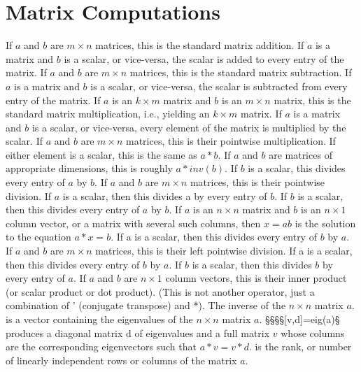\section{Matrix Computations}{}
	{If $a$ and $b$ are $m \times n$ matrices, this is the standard matrix addition. If $a$ is a matrix and $b$ is a scalar, or vice-versa, the scalar is added to every entry of the matrix.}
	{If $a$ and $b$ are $m \times n$ matrices, this is the standard matrix subtraction. If $a$ is a matrix and $b$ is a scalar, or vice-versa, the scalar is subtracted from every entry of the matrix.}
	{If $a$ is an $k \times m$ matrix and $b$ is an $m \times n$ matrix, this is the standard matrix multiplication, i.e., yielding an $k \times m$ matrix. If $a$ is a matrix and $b$ is a scalar, or vice-versa, every element of the matrix is multiplied by the scalar.}
	{If $a$ and $b$ are $m \times n$ matrices, this is their pointwise multiplication. If either element is a scalar, this is the same as $a*b$.}
	{If $a$ and $b$ are matrices of appropriate dimensions, this is roughly $a*inv(b).$ If $b$ is a scalar, this divides every entry of $a$ by $b$.}
	{If $a$ and $b$ are $m \times n$ matrices, this is their
pointwise division. If $a$ is a scalar, then this divides a by every entry of
$b$. If $b$ is a scalar, then this divides every entry of $a$ by $b$. }
	{If $a$ is an $n \times n$ matrix and $b$ is an $n \times
1$ column vector, or a matrix with several such columns, then $x=a$\bs$b$ is the
solution to the equation $a*x=b$. If a is a scalar, then this divides every
entry of $b$ by $a$.}
	{If $a$ and $b$ are $m \times n$ matrices, this is their
left pointwise division. If a is a scalar, then this divides every entry of $b$
by $a$. If $b$ is a scalar, then this divides $b$ by every entry of $a$.}
	{If $a$ and $b$ are $n \times 1$ column vectors, this is their inner product (or scalar product or dot product). (This is not another operator, just a combination of ' (conjugate transpose) and *).}
	{The inverse of the $n \times n$ matrix $a$.}
	{is a vector containing the eigenvalues of the $n \times n$ matrix $a$.}
§§§§[v,d]=eig(a)§ produces a diagonal matrix d of eigenvalues and a full matrix $v$ whose columns are the corresponding eigenvectors such that $a*v=v*d$.
	{is the rank, or number of linearly independent rows or columns of the matrix $a$.}

